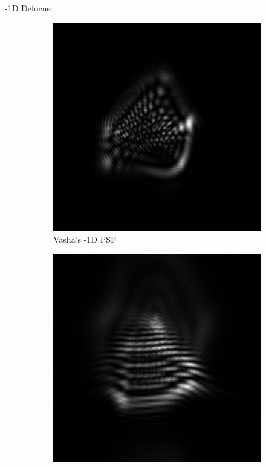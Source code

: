 \documentclass{article}
\begin{document}
-1D Defocus:
\begin{figure}[H]

\begin{subfigure}{.3\textwidth}
  \centering
  \includegraphics[width=1\linewidth]{Vasha_R_G_0530_2_500_zer_-1_5_PSF.png}
  \caption{Vasha's -1D PSF}
  \label{fig:vashan1dpsf}
\end{subfigure}
\begin{subfigure}{.3\textwidth}
  \centering
  \includegraphics[width=1\linewidth]{Liz_R_G_0523_2_500_zer_-1_5_PSF.png}

\end{subfigure}
\end{figure}
\end{document}
